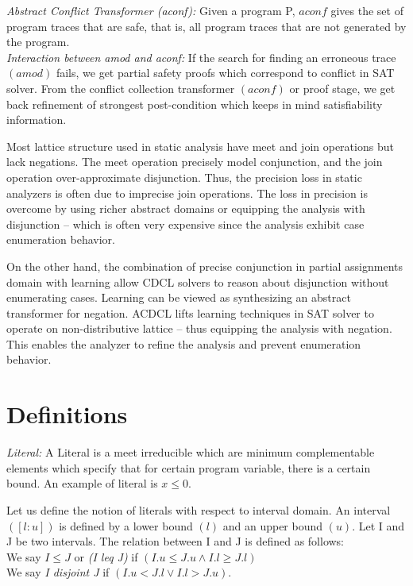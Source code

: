 \documentclass[a4paper,conference]{llncs}
\begin{document}
\textit{Abstract Conflict Transformer (aconf):} Given a program P, $aconf$ gives the 
set of program traces that are safe, that is, all program traces that are not
generated by the program. \\

\textit{Interaction between amod and aconf:} If the search for finding an 
erroneous trace $(amod)$ fails, we get partial safety proofs which correspond 
to conflict in SAT solver. From the conflict collection transformer $(aconf)$ or 
proof stage, we get back refinement of strongest post-condition which keeps in 
mind satisfiability information. 

Most lattice structure used in static analysis have meet and join operations 
but lack negations. The meet operation precisely model conjunction, and
the join operation over-approximate disjunction. Thus, the precision loss in 
static analyzers is often due to imprecise join operations. The loss in precision is
overcome by using richer abstract domains or equipping the analysis with disjunction --
which is often very expensive since the analysis exhibit case enumeration behavior. 
 
On the other hand, the combination of precise conjunction in partial assignments domain 
with learning allow CDCL solvers to reason about disjunction without 
enumerating cases. Learning can be viewed as synthesizing an abstract transformer for 
negation. ACDCL lifts learning techniques in SAT solver to operate on non-distributive 
lattice -- thus equipping the analysis with negation. This enables the analyzer to refine 
the analysis and prevent enumeration behavior. 

\section{Definitions}
\textit{Literal:} A Literal is a meet irreducible which are minimum complementable
elements which specify that for certain program variable, there is a certain
bound. An example of literal is $x \leq 0$.

Let us define the notion of literals with respect to interval domain. 
An interval $([l:u])$ is defined by a lower bound $(l)$ and an upper bound $(u)$.
Let I and J be two intervals. The relation between I and J is defined as follows:\\
We say $I \leq J$ or {\em (I leq J)} if $(I.u \leq J.u \wedge I.l \geq J.l)$\\
We say {\em I disjoint J} if $(I.u < J.l \vee  I.l > J.u)$.
\end{document}
